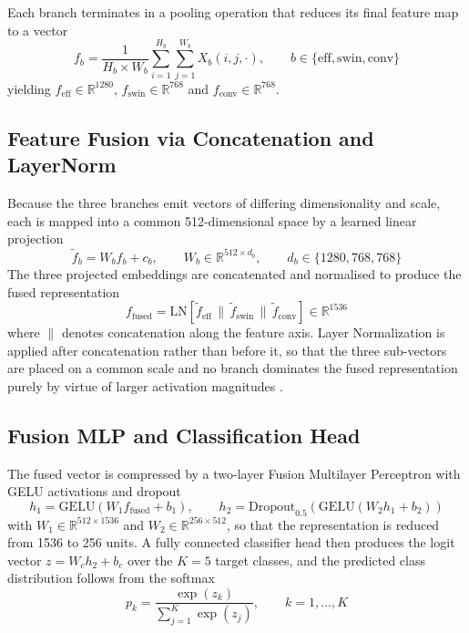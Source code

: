 \documentclass[pdflatex,sn-mathphys-num]{sn-jnl}%
\begin{document}
Each branch terminates in a pooling operation that reduces its final feature map to a vector
\begin{equation}
f_{b} = \frac{1}{H_{b} \times W_{b}} \sum_{i=1}^{H_{b}} \sum_{j=1}^{W_{b}} X_{b}(i,j,\cdot),
\qquad b \in \{\mathrm{eff}, \mathrm{swin}, \mathrm{conv}\}
\end{equation}
yielding $f_{\mathrm{eff}} \in \mathbb{R}^{1280}$, $f_{\mathrm{swin}} \in \mathbb{R}^{768}$
and $f_{\mathrm{conv}} \in \mathbb{R}^{768}$.

\subsection{Feature Fusion via Concatenation and LayerNorm}

Because the three branches emit vectors of differing dimensionality and scale, each is mapped
into a common 512-dimensional space by a learned linear projection
\begin{equation}
\tilde{f}_{b} = W_{b} f_{b} + c_{b}, \qquad W_{b} \in \mathbb{R}^{512 \times d_{b}},
\qquad d_{b} \in \{1280, 768, 768\}
\end{equation}
The three projected embeddings are concatenated and normalised to produce the fused
representation
\begin{equation}
f_{\mathrm{fused}} = \mathrm{LN}\!\left[\tilde{f}_{\mathrm{eff}} \,\|\, \tilde{f}_{\mathrm{swin}}
\,\|\, \tilde{f}_{\mathrm{conv}}\right] \in \mathbb{R}^{1536}
\end{equation}
where $\|$ denotes concatenation along the feature axis. Layer Normalization is applied after
concatenation rather than before it, so that the three sub-vectors are placed on a common
scale and no branch dominates the fused representation purely by virtue of larger activation
magnitudes \cite{ref13}.

\subsection{Fusion MLP and Classification Head}

The fused vector is compressed by a two-layer Fusion Multilayer Perceptron with GELU
activations and dropout
\begin{equation}
h_{1} = \mathrm{GELU}(W_{1} f_{\mathrm{fused}} + b_{1}), \qquad
h_{2} = \mathrm{Dropout}_{0.5}\!\left(\mathrm{GELU}(W_{2} h_{1} + b_{2})\right)
\end{equation}
with $W_{1} \in \mathbb{R}^{512 \times 1536}$ and $W_{2} \in \mathbb{R}^{256 \times 512}$, so
that the representation is reduced from 1536 to 256 units. A fully connected classifier head
then produces the logit vector $z = W_{c} h_{2} + b_{c}$ over the $K = 5$ target classes, and
the predicted class distribution follows from the softmax
\begin{equation}
p_{k} = \frac{\exp(z_{k})}{\sum_{j=1}^{K} \exp(z_{j})}, \qquad k = 1, \ldots, K
\end{equation}
\end{document}
